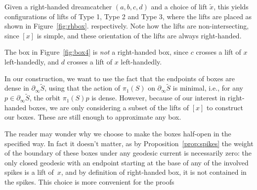 Given a right-handed dreamcatcher $(a,b,c,d)$ and a choice of lift $\tilde{x}$,  this yields configurations of lifts of Type 1, Type 2 and Type 3, where the lifts are placed as shown in Figure~\ref{fig:rhbox}. respectively.
Note how the lifts are non-intersecting, since $[x]$ is simple, and these orientation of the lifts are always right-handed.
\begin{example}
The box in Figure~\ref{fig:box4} is \emph{not} a right-handed box, since $c$ crosses a lift of $x$ left-handedly, and $d$ crosses a lift of $x$ left-handedly.
\begin{figure}
\end{figure}
\end{example}

In our construction, we want to use the fact that the endpoints of boxes are dense in $\partial_{\infty} \tilde{S}$, using that the action of $\pi_1(S)$ on $\partial_{\infty} \tilde{S}$ is minimal, i.e., for any $p \in \partial_{\infty} \tilde{S}$, the orbit $\pi_1(S)p$ is dense. 
However, because of our interest in right-handed boxes, we are only considering a subset of the lifts of $[x]$ to construct our boxes.
These are still enough to approximate any box.

\begin{remark}
  The reader may wonder why we choose to make the boxes half-open in
  the specified way. In fact it doesn't matter, as by
  Proposition~\ref{prop:spikes}
  the weight of the
  boundary of these boxes under any geodesic current is necessarily
  zero: the only closed geodesic with an endpoint starting at the base
  of any of the involved spikes is a lift of~$x$, and by definition of
  right-handed box, it is not contained in the spikes. This choice is
  more convenient for the proofs 
\end{remark}

